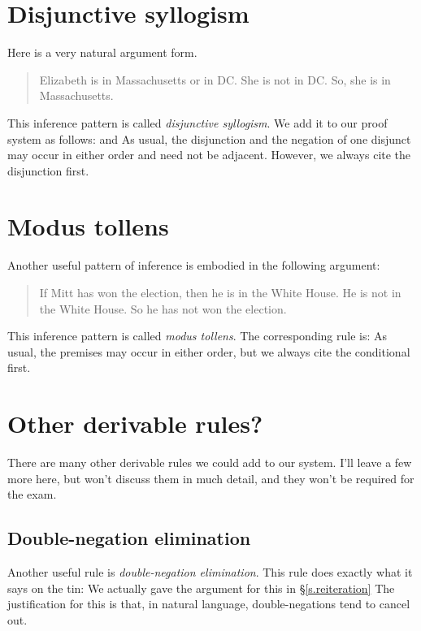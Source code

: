 \section{Disjunctive syllogism}
Here is a very natural argument form.
	\begin{quote}
		Elizabeth is in Massachusetts or in DC. She is not in DC. So, she is in Massachusetts.
	\end{quote}
This inference pattern is called \emph{disjunctive syllogism}. We add it to our proof system as follows:
and
As usual, the disjunction and the negation of one disjunct may occur in either order and need not be adjacent. However, we always cite the disjunction first. 

\section{Modus tollens}
Another useful pattern of inference is embodied in the following argument:
	\begin{quote}
		If Mitt has won the election, then he is in the White House. He is not in the White House. So he has not won the election.
	\end{quote}
This inference pattern is called \emph{modus tollens}. The corresponding rule is:
As usual, the premises may occur in either order, but we always cite the conditional first. 

\section{Other derivable rules?}\nonexaminable
There are many other derivable rules we could add to our system. I'll leave a few more here, but won't discuss them in much detail, and they won't be required for the exam. 

\subsection{Double-negation elimination}
Another useful rule is \emph{double-negation elimination}. This rule does exactly what it says on the tin:
We actually gave the argument for this in \S\ref{s.reiteration}
The justification for this is that, in natural language, double-negations tend to cancel out. 

